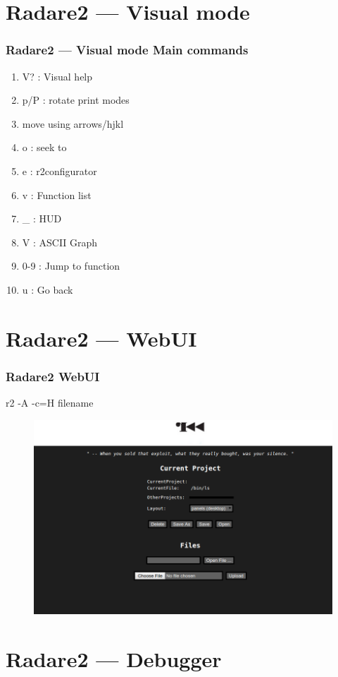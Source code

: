 \documentclass[10pt,pdf,utf8,english,compress,hyperref={unicode}]{beamer}
\begin{document}
\section{Radare2 — Visual mode}
\begin{frame}[fragile]
  \frametitle{Radare2 — Visual mode Main commands}
  \begin{enumerate}
  \item V? : Visual help
  \item p/P : rotate print modes
  \item move using arrows/hjkl
  \item o : seek to
  \item e : r2configurator
  \item v : Function list
  \item \_ : HUD
  \item V : ASCII Graph
  \item 0-9 : Jump to function
  \item u : Go back
 \end{enumerate}
\end{frame}

\section{Radare2 — WebUI}
\begin{frame}[fragile]
  \frametitle{Radare2 WebUI}
  r2 -A -c=H filename
  \begin{figure}
  \includegraphics[width=\textwidth]{web.png}
  \end{figure}
\end{frame}

\section{Radare2 — Debugger}
\end{document}

